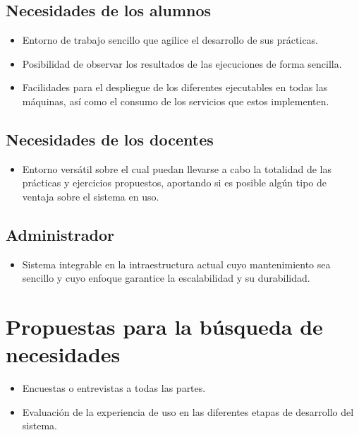 \subsection{Necesidades de los alumnos}

\begin{itemize}
  \item Entorno de trabajo sencillo que agilice el desarrollo de sus prácticas.
  \item Posibilidad de observar los resultados de las ejecuciones de forma sencilla.
  \item Facilidades para el despliegue de los diferentes ejecutables en todas las máquinas, así como el consumo de los servicios que estos implementen.
\end{itemize}

\subsection{Necesidades de los docentes}

\begin{itemize}
  \item Entorno versátil sobre el cual puedan llevarse a cabo la totalidad de las prácticas y ejercicios propuestos, aportando si es posible algún tipo de ventaja sobre el sistema en uso.
\end{itemize}

\subsection{Administrador}

\begin{itemize}
  \item Sistema integrable en la intraestructura actual cuyo mantenimiento sea sencillo y cuyo enfoque garantice la escalabilidad y su durabilidad.
\end{itemize}

\section{Propuestas para la búsqueda de necesidades}

\begin{itemize}
  \item Encuestas o entrevistas a todas las partes.
  \item Evaluación de la experiencia de uso en las diferentes etapas de desarrollo del sistema.
\end{itemize}

